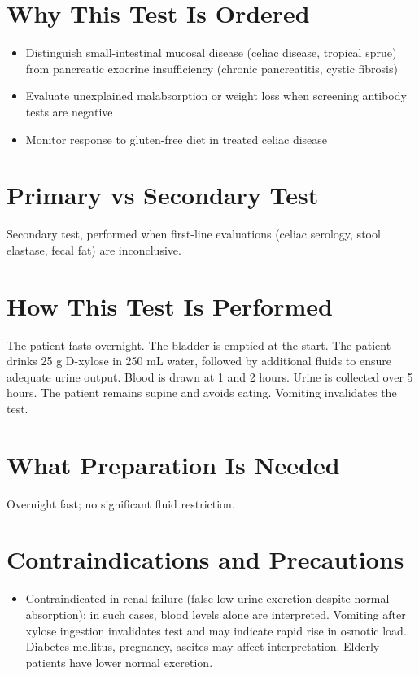 \section*{Why This Test Is Ordered}
\begin{itemize}
  \item Distinguish small-intestinal mucosal disease (celiac disease, tropical sprue) from pancreatic exocrine insufficiency (chronic pancreatitis, cystic fibrosis)
  \item Evaluate unexplained malabsorption or weight loss when screening antibody tests are negative
  \item Monitor response to gluten-free diet in treated celiac disease
\end{itemize}

\section*{Primary vs Secondary Test}
Secondary test, performed when first-line evaluations (celiac serology, stool elastase, fecal fat) are inconclusive.

\section*{How This Test Is Performed}
The patient fasts overnight. The bladder is emptied at the start. The patient drinks 25 g D-xylose in 250 mL water, followed by additional fluids to ensure adequate urine output. Blood is drawn at 1 and 2 hours. Urine is collected over 5 hours. The patient remains supine and avoids eating. Vomiting invalidates the test.

\section*{What Preparation Is Needed}
Overnight fast; no significant fluid restriction.

\section*{Contraindications and Precautions}
\begin{itemize}
  \item Contraindicated in renal failure (false low urine excretion despite normal absorption); in such cases, blood levels alone are interpreted. Vomiting after xylose ingestion invalidates test and may indicate rapid rise in osmotic load. Diabetes mellitus, pregnancy, ascites may affect interpretation. Elderly patients have lower normal excretion.
\end{itemize}
